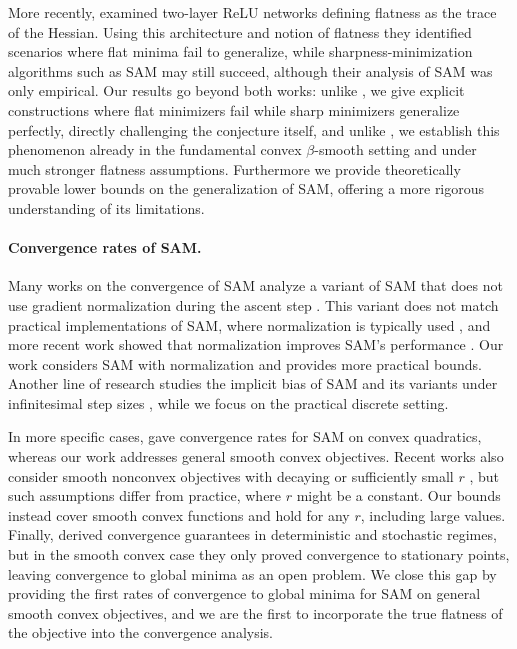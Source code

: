 \documentclass[11pt]{article}
\newcommand{\rad}{r}
\begin{document}
More recently, \citet{wen2023sharpness} examined two-layer ReLU networks defining flatness as the trace of the Hessian. Using this architecture and notion of flatness they identified scenarios where flat minima fail to generalize, while sharpness-minimization algorithms such as SAM may still succeed, although their analysis of SAM was only empirical. Our results go beyond both works: unlike \cite{dinh2017sharp}, we give explicit constructions where flat minimizers fail while sharp minimizers generalize perfectly, directly challenging the conjecture itself, and unlike \cite{wen2023sharpness}, we establish this phenomenon already in the fundamental convex $\beta$-smooth setting and under much stronger flatness assumptions. Furthermore we provide theoretically provable lower bounds on the generalization of SAM, offering a more rigorous understanding of its limitations.

\paragraph{Convergence rates of SAM.}
Many works on the convergence of SAM analyze a variant of SAM that does not use gradient normalization during the ascent step \citep{andriushchenko2022towards,behdin2023sharpness,agarwala2023sam,kim2023stability}. 
This variant does not match practical implementations of SAM, where normalization is typically used \citep{si2023practical}, and more recent work showed that normalization improves SAM’s performance \citep{dai2024crucial}. 
Our work considers SAM with normalization and provides more practical bounds. 
Another line of research studies the implicit bias of SAM and its variants under infinitesimal step sizes \citep{wen2022does,andriushchenko2022towards}, while we focus on the practical discrete setting. 

In more specific cases, \citet{bartlett2023dynamics} gave convergence rates for SAM on convex quadratics, whereas our work addresses general smooth convex objectives. 
Recent works also consider smooth nonconvex objectives with decaying or sufficiently small $\rad$ \citep{mi2022make,zhuang2022surrogate,sun2024adasam}, but such assumptions differ from practice, where $\rad$ might be a constant. 
Our bounds instead cover smooth convex functions and hold for any $\rad$, including large values. 
Finally, \citet{si2023practical} derived convergence guarantees in deterministic and stochastic regimes, but in the smooth convex case they only proved convergence to stationary points, leaving convergence to global minima as an open problem. 
We close this gap by providing the first rates of convergence to global minima for SAM on general smooth convex objectives, and we are the first to incorporate the true flatness of the objective into the convergence analysis.  
\end{document}
